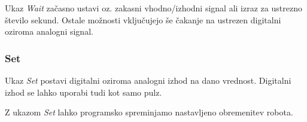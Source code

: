 Ukaz \emph{Wait} začasno ustavi oz. zakasni vhodno/izhodni signal ali izraz za ustrezno število sekund. Ostale možnosti vključujejo še čakanje na ustrezen digitalni oziroma analogni signal.


\subsubsection{Set}

Ukaz \emph{Set} postavi digitalni oziroma analogni izhod na dano vrednost. Digitalni izhod se lahko uporabi tudi kot samo pulz.

Z ukazom \emph{Set} lahko programsko spreminjamo nastavljeno obremenitev robota.


%
%
%
%
%
%
